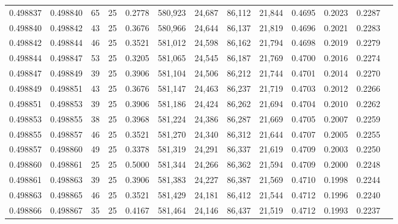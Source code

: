 \begin{tabular}{rrrrrrrrrrrrr}
0.498837 & 0.498840 &    65 &  25 &                                     0.2778 & 580,923 &  24,687 &  86,112 &  21,844 & 0.4695 & 0.2023 & 0.2287 \\
0.498840 & 0.498842 &    43 &  25 &                                     0.3676 & 580,966 &  24,644 &  86,137 &  21,819 & 0.4696 & 0.2021 & 0.2283 \\
0.498842 & 0.498844 &    46 &  25 &                                     0.3521 & 581,012 &  24,598 &  86,162 &  21,794 & 0.4698 & 0.2019 & 0.2279 \\
0.498844 & 0.498847 &    53 &  25 &                                     0.3205 & 581,065 &  24,545 &  86,187 &  21,769 & 0.4700 & 0.2016 & 0.2274 \\
0.498847 & 0.498849 &    39 &  25 &                                     0.3906 & 581,104 &  24,506 &  86,212 &  21,744 & 0.4701 & 0.2014 & 0.2270 \\
0.498849 & 0.498851 &    43 &  25 &                                     0.3676 & 581,147 &  24,463 &  86,237 &  21,719 & 0.4703 & 0.2012 & 0.2266 \\
0.498851 & 0.498853 &    39 &  25 &                                     0.3906 & 581,186 &  24,424 &  86,262 &  21,694 & 0.4704 & 0.2010 & 0.2262 \\
0.498853 & 0.498855 &    38 &  25 &                                     0.3968 & 581,224 &  24,386 &  86,287 &  21,669 & 0.4705 & 0.2007 & 0.2259 \\
0.498855 & 0.498857 &    46 &  25 &                                     0.3521 & 581,270 &  24,340 &  86,312 &  21,644 & 0.4707 & 0.2005 & 0.2255 \\
0.498857 & 0.498860 &    49 &  25 &                                     0.3378 & 581,319 &  24,291 &  86,337 &  21,619 & 0.4709 & 0.2003 & 0.2250 \\
0.498860 & 0.498861 &    25 &  25 &                                     0.5000 & 581,344 &  24,266 &  86,362 &  21,594 & 0.4709 & 0.2000 & 0.2248 \\
0.498861 & 0.498863 &    39 &  25 &                                     0.3906 & 581,383 &  24,227 &  86,387 &  21,569 & 0.4710 & 0.1998 & 0.2244 \\
0.498863 & 0.498865 &    46 &  25 &                                     0.3521 & 581,429 &  24,181 &  86,412 &  21,544 & 0.4712 & 0.1996 & 0.2240 \\
0.498866 & 0.498867 &    35 &  25 &                                     0.4167 & 581,464 &  24,146 &  86,437 &  21,519 & 0.4712 & 0.1993 & 0.2237 \\

\end{tabular}
